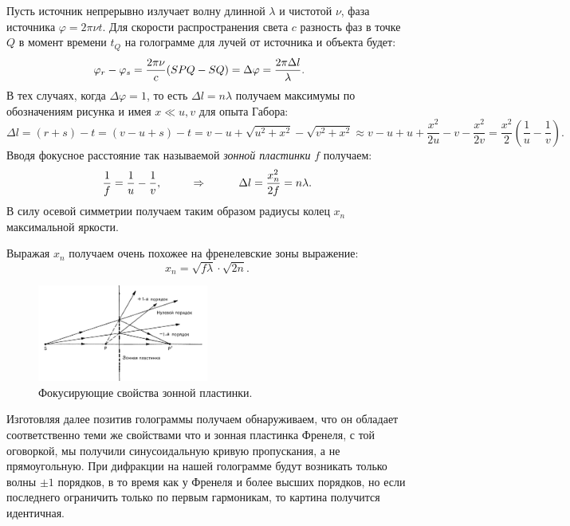 Пусть источник непрерывно излучает волну длинной $\lambda$ и чистотой $\nu$, фаза источника $\varphi = 2 \pi \nu t$.
Для скорости распространения света $c$ разность фаз в точке $Q$ в момент времени $t_Q$ на голограмме для лучей от источника и объекта будет:
\begin{equation*}
	\hspace{-5mm} \varphi_r - \varphi_s = \frac{2 \pi \nu}{c} (SPQ - SQ) = \Delta \varphi = \frac{2 \pi \Delta l}{\lambda}.
\end{equation*}
В тех случаях, когда $\Delta \varphi = 1$, то есть $\Delta l = n \lambda$ получаем максимумы по обозначениям рисунка и имея $x \ll u,v$ для опыта Габора:
\begin{equation*}
	\Delta l = (r+s) - t = (v - u + s) - t = v - u + \sqrt{u^2 + x^2} - \sqrt{v^2 + x^2} \approx v - u + u + \frac{x^2}{2 u} - v - \frac{x^2}{2 v} = \frac{x^2}{2}\left(\frac{1}{u} - \frac{1}{v}\right).
\end{equation*}
Вводя фокусное расстояние так называемой \textit{зонной пластинки} $f$ получаем:
\begin{equation*}
 	\frac{1}{f} = \frac{1}{u} - \frac{1}{v},
 	\hspace{1 cm}
 	\Rightarrow
 	\hspace{1 cm}
 	\Delta l = \frac{x_n^2}{2 f} = n \lambda.
 \end{equation*} 
 В силу осевой симметрии получаем таким образом радиусы колец $x_n$ максимальной яркости.

 Выражая $x_n$ получаем очень похожее на френелевские зоны выражение:
 \begin{equation*}
 	x_n = \sqrt{f \lambda} \cdot \sqrt{2 n}.
 \end{equation*}

 \begin{figure}
     \centering
     \includegraphics[width=0.5\textwidth]{figures/vosstan_gabor.png}
     \caption{Фокусирующие свойства зонной пластинки.}
 \end{figure}
 Изготовляя далее позитив голограммы получаем обнаруживаем, что он обладает соответственно теми же свойствами что и зонная пластинка Френеля, с той оговоркой, мы получили синусоидальную кривую пропускания, а не прямоугольную. При дифракции на нашей голограмме будут возникать только волны $\pm 1$ порядков, в то время как у Френеля и более высших порядков, но если последнего ограничить только по первым гармоникам, то картина получится идентичная.

